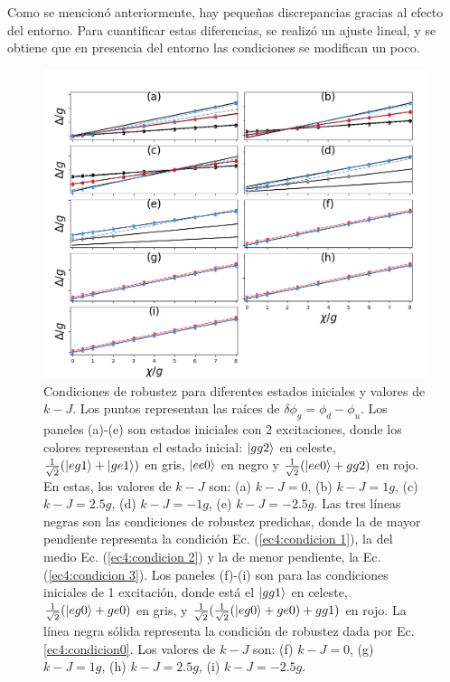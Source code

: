 Como se mencionó anteriormente, hay pequeñas discrepancias gracias al efecto del entorno. Para cuantificar estas diferencias, se realizó un ajuste lineal, y se obtiene que en presencia del entorno las condiciones se modifican un poco.
\begin{figure}[h]
    \centering
    \includegraphics[width=\linewidth]{figuras/ch5/robustez/raices.png}
    \caption{Condiciones de robustez para diferentes estados iniciales y valores de $k-J$. Los puntos representan las raíces de $\delta\phi_g=\phi_d-\phi_u$. Los paneles (a)-(e) son estados iniciales con 2 excitaciones, donde los colores representan el estado inicial: $\ket{gg2}$ en celeste, $\frac{1}{\sqrt{2}}(\ket{eg1}+\ket{ge1})$ en gris, $\ket{ee0}$ en negro y $\frac{1}{\sqrt{2}}(\ket{ee0}+{gg2})$ en rojo. En estas, los valores de $k-J$ son: (a) $k-J=0$, (b) $k-J=1g$, (c) $k-J=2.5g$, (d) $k-J=-1g$, (e) $k-J=-2.5g$. Las tres líneas negras son las condiciones de robustez predichas, donde la de mayor pendiente representa la condición Ec. (\ref{ec4:condicion 1}), la del medio Ec. (\ref{ec4:condicion 2}) y la de menor pendiente, la Ec. (\ref{ec4:condicion 3}). Los paneles (f)-(i) son para las condiciones iniciales de 1 excitación, donde está el $\ket{gg1}$ en celeste, $\frac{1}{\sqrt{2}}(\ket{eg0}+{ge0})$ en gris, y $\frac{1}{\sqrt{2}}(\frac{1}{\sqrt{2}}(\ket{eg0}+{ge0})+gg1)$ en rojo. La línea negra sólida representa la condición de robustez dada por Ec. \ref{ec4:condicion0}. Los valores de $k-J$ son: (f) $k-J=0$, (g) $k-J=1g$, (h) $k-J=2.5g$, (i) $k-J=-2.5g$.}
    \label{fig5:raices}
\end{figure}


